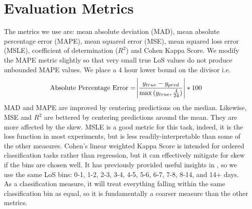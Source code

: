 \documentclass[sigconf]{acmart}
\begin{document}
\section{Evaluation Metrics}
\label{evaluationmetrics}
The metrics we use are: mean absolute deviation (MAD), mean absolute percentage error (MAPE), mean squared error (MSE), mean squared loss error (MSLE), coefficient of determination ($R^2$) and Cohen Kappa Score. We modify the MAPE metric slightly so that very small true LoS values do not produce unbounded MAPE values. We place a 4 hour lower bound on the divisor i.e. 
\begin{equation*}
    \text{Absolute Percentage Error} = \abs{\frac{y_{true} - y_{pred}}{\max{(y_{true}, \frac{4}{24})}}}*100
\end{equation*} 
MAD and MAPE are improved by centering predictions on the median. Likewise, MSE and $R^2$ are bettered by centering predictions around the mean. They are more affected by the skew. MSLE is a good metric for this task, indeed, it is the loss function in most experiments, but is less readily-interpretable than some of the other measures. Cohen's linear weighted Kappa Score \citep{doi:10.1177/001316446002000104} is intended for ordered classification tasks rather than regression, but it can effectively mitigate for skew if the bins are chosen well. It has previously provided useful insights in \citet{harutyunyan}, so we use the same LoS bins: 0-1, 1-2, 2-3, 3-4, 4-5, 5-6, 6-7, 7-8, 8-14, and 14+ days. As a classification measure, it will treat everything falling within the same classification bin as equal, so it is fundamentally a coarser measure than the other metrics.
\end{document}
